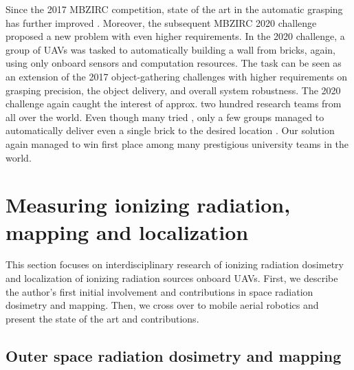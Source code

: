 \documentclass[a4paper,11pt,twoside,openright]{book}
\begin{document}
Since the 2017 \ac{MBZIRC} competition, state of the art in the automatic grasping has further improved \cite{ruggiero2018aerial, feng2020packages}.
Moreover, the subsequent \ac{MBZIRC} 2020 challenge proposed a new problem with even higher requirements.
In the 2020 challenge, a group of \acp{UAV} was tasked to automatically building a wall from bricks, again, using only onboard sensors and computation resources.
The task can be seen as an extension of the 2017 object-gathering challenges with higher requirements on grasping precision, the object delivery, and overall system robustness.
The 2020 challenge again caught the interest of approx. two hundred research teams from all over the world.
Even though many tried \cite{lenz2020autonomous, ankit2020multi}, only a few groups managed to automatically deliver even a single brick to the desired location \cite{baca2020autonomous, lenz2020autonomous, krizmancic2020cooperative}.
Our solution \cite{baca2020autonomous, baca2020mrs} again managed to win first place among many prestigious university teams in the world.



\section{Measuring ionizing radiation, mapping and localization}

This section focuses on interdisciplinary research of ionizing radiation dosimetry and localization of ionizing radiation sources onboard \aclp{UAV}.
First, we describe the author's first initial involvement and contributions in space radiation dosimetry and mapping.
Then, we cross over to mobile aerial robotics and present the state of the art and contributions.


\subsection{Outer space radiation dosimetry and mapping}
\end{document}
